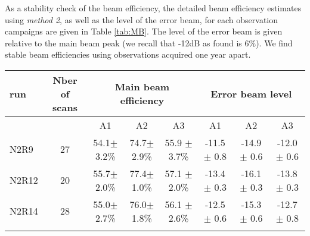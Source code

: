 As a stability check of the beam efficiency, the detailed beam
efficiency estimates using \emph{method 2}, as well as the level of
the error beam, for each observation campaigns are given in Table
\ref{tab:MB}. The level of the error beam is given relative to the
main beam peak (we recall that -12dB as found is $6\%$). We find
stable beam efficiencies using observations acquired one year apart.



\begin{table*}[!h]
\caption{Main beam efficiency and level of error beam}
\label{tab:MB}
\centering
\begin{tabular}{l| c | c c c | c c c}
\hline\hline
\noalign{\smallskip}
run  & Nber of scans & \multicolumn{3}{c}{Main beam efficiency } & \multicolumn{3}{c}{Error beam level} \\
\hline
     &               &  A1    &    A2   &  A3    & A1  &  A2  & A3   \\
            \hline
N2R9    & 27  &  54.1$\pm$ 3.2\%   &  74.7$\pm$ 2.9\%  & 55.9 $\pm$ 3.7\%   &  -11.5 $\pm$ 0.8    &  -14.9 $\pm$ 0.6   &  -12.0 $\pm$ 0.6   \\
N2R12   & 20  &  55.7$\pm$ 2.0\%   &  77.4$\pm$ 1.0\%  & 57.1 $\pm$ 2.0\%   &  -13.4 $\pm$ 0.3    &  -16.1 $\pm$ 0.3   &  -13.8 $\pm$ 0.3   \\
N2R14   & 28  &  55.0$\pm$ 2.7\%   &  76.0$\pm$ 1.8\%  & 56.1 $\pm$ 2.6\%   &  -12.5 $\pm$ 0.6    &  -15.3 $\pm$ 0.6   &  -12.7 $\pm$ 0.8   \\
            \noalign{\smallskip}
            \hline
\end{tabular}
\end{table*}

